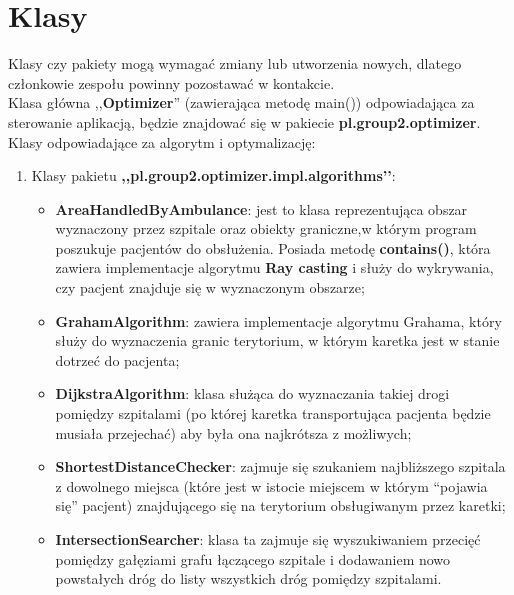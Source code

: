 \documentclass{article}
\begin{document}
\section{Klasy}
{\fontsize{12}{12}\selectfont
Klasy czy pakiety mogą wymagać zmiany lub utworzenia nowych, dlatego członkowie zespołu powinny pozostawać w kontakcie. \\

Klasa główna ,,\textbf{Optimizer}'' (zawierająca metodę main()) odpowiadająca za sterowanie aplikacją, będzie znajdować się w pakiecie \textbf{pl.group2.optimizer}. \\

Klasy odpowiadające za algorytm i optymalizację:
\begin{enumerate}
    \item Klasy pakietu \textbf{,,pl.group2.optimizer.impl.algorithms’’}:
    \begin{itemize}
        \item \textbf{AreaHandledByAmbulance}: jest to klasa reprezentująca obszar wyznaczony przez szpitale oraz obiekty graniczne,w którym program poszukuje pacjentów do obsłużenia. Posiada metodę \textbf{contains()}, która zawiera implementacje algorytmu \textbf{Ray casting} i służy do wykrywania, czy pacjent znajduje się w wyznaczonym obszarze;

        \item \textbf{GrahamAlgorithm}: zawiera implementacje algorytmu Grahama, który służy do wyznaczenia granic terytorium, w którym karetka jest w stanie dotrzeć do pacjenta;

        \item \textbf{DijkstraAlgorithm}: klasa służąca do wyznaczania takiej drogi pomiędzy szpitalami (po której karetka transportująca pacjenta będzie musiała przejechać) aby była ona najkrótsza z możliwych;

        \item \textbf{ShortestDistanceChecker}: zajmuje się szukaniem najbliższego szpitala z dowolnego miejsca (które jest w istocie miejscem w którym “pojawia się” pacjent) znajdującego się na terytorium obsługiwanym przez karetki;
        \item \textbf{IntersectionSearcher}: klasa ta zajmuje się wyszukiwaniem przecięć pomiędzy gałęziami grafu łączącego szpitale i dodawaniem nowo powstałych dróg do listy wszystkich dróg pomiędzy szpitalami.
        
    \end{itemize}
    

\end{enumerate}}
\end{document}
